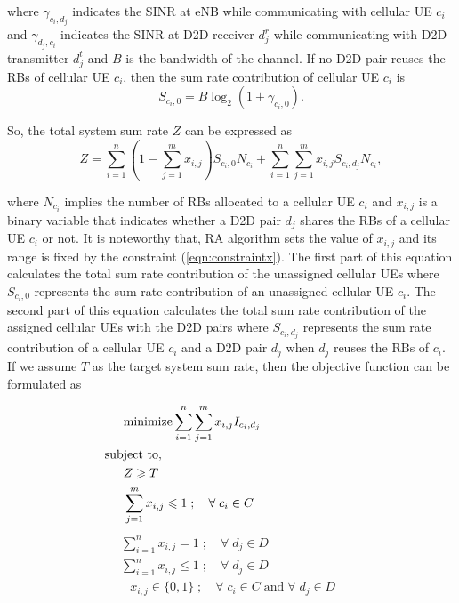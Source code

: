\documentclass{ieeeaccess}
\begin{document}
where $\gamma_{c_i,d_j}$ indicates the SINR at eNB while communicating with cellular UE $c_i$ and $\gamma_{d_j,c_i}$ indicates the SINR at D2D receiver $d_{j}^r$ while communicating with D2D transmitter $d_{j}^t$ and $B$ is the bandwidth of the channel. If no D2D pair reuses the RBs of cellular UE $c_i$, then  the sum rate contribution of cellular UE $c_i$ is
\begin{equation}\label{eqn:sumrate_0}
S_{c_i,0} = B\log_{2}(1+\gamma_{c_i,0}).
\end{equation}

So, the total system sum rate $Z$ can be expressed as 
\begin{equation}\label{eqn:sumrate_total}
Z=\sum_{i = 1}^{n}(1 - \sum_{j = 1}^{m} x_{i,j}) S_{c_i,0}N_{c_i}+\sum_{i = 1}^{n}\sum_{j = 1}^{m} x_{i,j} S_{c_i,d_j} N_{c_i},
\end{equation}

where $N_{c_i}$ implies the number of RBs allocated to a cellular UE $c_i$ and $x_{i,j}$ is a binary variable that indicates whether a D2D pair $d_j$ shares the RBs of a cellular UE $c_i$ or not. It is noteworthy that, RA algorithm sets the value of $x_{i,j}$ and its range is fixed by the constraint (\ref{eqn:constraintx}).  The first part of this equation calculates the total sum rate contribution of the unassigned cellular UEs where $S_{c_i,0}$ represents the sum rate contribution of an unassigned cellular UE $c_i$. The second part of this equation calculates the total sum rate contribution of the assigned cellular UEs with the D2D pairs where $S_{c_i,d_j}$ represents the sum rate contribution of a cellular UE $c_i$ and a D2D pair $d_j$ when $d_j$ reuses the RBs of $c_i$. If we assume $T$ as the target system sum rate, then the objective function can be formulated as

\begin{align}
&\text{minimize} \sum_{i=1}^{n}\sum_{j=1}^{m} x_{i,j} I_{c_i,d_j}  \label{eqn:objective} \\
\text{sub}&\text{ject}\text{ to,}\notag\\
&Z \geqslant T \label{eqn:constrain_target}\\
&\sum_{j=1}^{m}x_{i,j} \leqslant 1\;; \quad \forall \;c_i \in C \;\;\;\;\;\;\;\;\;\;\;\;\;\;\;\;\;\;\;\;\;\;\;\;\;\;\;\;\;\;  \label{eqn:constraintxc}
\end{align}
\begin{subequations}
\begin{align} 
&\sum_{i=1}^{n}x_{i,j} = 1\;; \quad \forall \;d_j \in D \;\;\;\;\;\;\;\;\;\;\;\;\;\;\;\;\;\;\;\;\;\;\;\; \label{eqn:constraintFair}\\
&\sum_{i=1}^{n}x_{i,j} \leqslant 1\;; \quad \forall \;d_j \in D \label{eqn:constraintRestricted}
\end{align} 
\end{subequations}
\begin{align} 
&x_{i,j} \in \{0,1\}\;; \quad \forall \;c_i \in C \;  \text{and} \; \forall \;d_j \in D \;\; \label{eqn:constraintx}
\end{align} 
\end{document}

